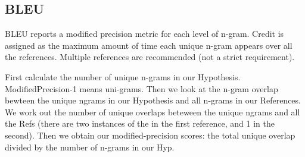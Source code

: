 \documentclass[11pt]{article}
\begin{document}
\subsection{BLEU}

BLEU reports a modified precision metric for each level of n-gram. Credit is assigned as the maximum amount of time each unique n-gram appears over all the references. Multiple references are recommended (not a strict requirement).

\begin{minipage}[l]{0.5\linewidth}
    \centering
\end{minipage}\hfill
\begin{minipage}[l]{0.5\linewidth}
    First calculate the number of unique n-grams in our Hypothesis. ModifiedPrecision-1 means uni-grams. Then we look at the n-gram overlap bewteen the unique ngrams in our Hypothesis and all n-grams in our References. We work out the number of unique overlaps beteween the unique ngrams and all the Refs (there are two instances of the in the first reference, and 1 in the second). Then we obtain our modified-precision scores: the total unique overlap divided by the number of n-grams in our Hyp.
\end{minipage}
\end{document}
